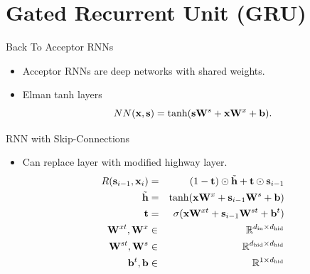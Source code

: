 \documentclass{beamer}
\begin{document}
\section{Gated Recurrent Unit (GRU)}

\begin{frame}{Back To Acceptor RNNs}
  \begin{itemize}

  \item Acceptor RNNs are deep networks with shared weights.

  \item Elman tanh layers 
    \[ NN(\mathbf{x}, \mathbf{s}) = \tanh( \mathbf{s} \mathbf{W}^s  +  \mathbf{x} \mathbf{W}^x  + \mathbf{b}).\]
    \air 
  \end{itemize}
  \begin{center}
    \vspace{-1cm}

  \end{center}
\end{frame}


\begin{frame}{RNN with Skip-Connections}

  \begin{itemize}
    \item Can replace layer with modified highway layer. 
    \begin{eqnarray*}
      R(\mathbf{s}_{i-1}, \mathbf{x}_i) &=& (1-\mathbf{t}) \odot \tilde{\mathbf{h}} + \mathbf{t} \odot \mathbf{s}_{i-1} \\
      \tilde{\mathbf{h}} &=& \tanh(\mathbf{x} \mathbf{W}^x + \mathbf{s}_{i-1} \mathbf{W}^s + \mathbf{b})  \\
      \mathbf{t} &=& \sigma(\mathbf{x} \mathbf{W}^{xt} + \mathbf{s}_{i-1}\mathbf{W}^{st} + \mathbf{b}^t) \\
      \mathbf{W}^{xt}, \mathbf{W}^{x} &\in& \mathbb{R}^{{d_{\mathrm{in}}} \times {d_{\mathrm{hid}}}} \\
      \mathbf{W}^{st}, \mathbf{W}^{s} &\in& \mathbb{R}^{{d_{\mathrm{hid}}} \times {d_{\mathrm{hid}}}} \\
      \mathbf{b}^t, \mathbf{b} &\in& \mathbb{R}^{1 \times {d_{\mathrm{hid}}}} \\
    \end{eqnarray*}
  \end{itemize}

\end{frame}
\end{document}
